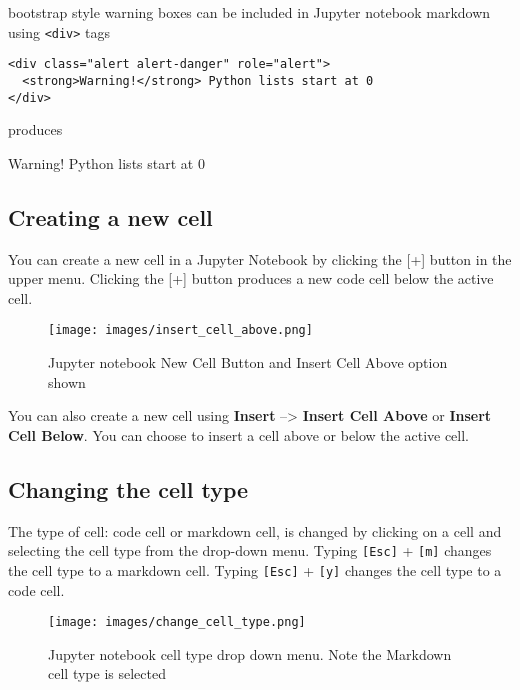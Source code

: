 \documentclass{book}
\makeatletter
\def\maxwidth{\ifdim\Gin@nat@width>\linewidth\linewidth
\else\Gin@nat@width\fi}
\let\Oldincludegraphics\includegraphics
\renewcommand{\includegraphics}[1]{\Oldincludegraphics[width=.8\maxwidth]{#1}}
\newcommand{\passthrough}[1]{#1}
\makeatother
\begin{document}
bootstrap style warning boxes can be included in Jupyter notebook
markdown using \passthrough{\lstinline!<div>!} tags

\begin{lstlisting}
<div class="alert alert-danger" role="alert">
  <strong>Warning!</strong> Python lists start at 0
</div>
\end{lstlisting}

produces

Warning! Python lists start at 0
    




    
        \hypertarget{creating-a-new-cell}{%
\subsection{Creating a new cell}\label{creating-a-new-cell}}

You can create a new cell in a Jupyter Notebook by clicking the {[}+{]}
button in the upper menu. Clicking the {[}+{]} button produces a new
code cell below the active cell.

\begin{figure}
\centering
\texttt{[image: images/insert\_cell\_above.png]}
\caption{Jupyter notebook New Cell Button and Insert Cell Above option
shown}
\end{figure}

You can also create a new cell using \textbf{Insert} --\textgreater{}
\textbf{Insert Cell Above} or \textbf{Insert Cell Below}. You can choose
to insert a cell above or below the active cell.
    




    
        \hypertarget{changing-the-cell-type}{%
\subsection{Changing the cell type}\label{changing-the-cell-type}}

The type of cell: code cell or markdown cell, is changed by clicking on
a cell and selecting the cell type from the drop-down menu. Typing
\passthrough{\lstinline![Esc]!} + \passthrough{\lstinline![m]!} changes
the cell type to a markdown cell. Typing \passthrough{\lstinline![Esc]!}
+ \passthrough{\lstinline![y]!} changes the cell type to a code cell.

\begin{figure}
\centering
\texttt{[image: images/change\_cell\_type.png]}
\caption{Jupyter notebook cell type drop down menu. Note the Markdown
cell type is selected}
\end{figure}
    
\end{document}
